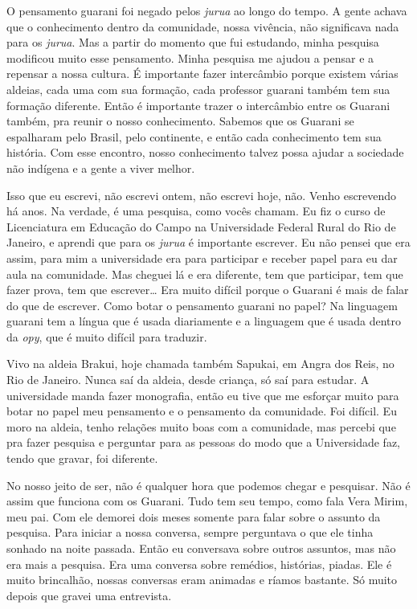 O pensamento guarani foi negado pelos \emph{jurua} ao longo do tempo. A gente
achava que o conhecimento dentro da comunidade, nossa vivência, não
significava nada para os \emph{jurua}. Mas a partir do momento que fui
estudando, minha pesquisa modificou muito esse pensamento. Minha
pesquisa me ajudou a pensar e a repensar a nossa cultura. É importante
fazer intercâmbio porque existem várias aldeias, cada uma com sua
formação, cada professor guarani também tem sua formação diferente.
Então é importante trazer o intercâmbio entre os Guarani também, pra
reunir o nosso conhecimento. Sabemos que os Guarani se espalharam pelo
Brasil, pelo continente, e então cada conhecimento tem sua história.
Com esse encontro, nosso conhecimento talvez possa ajudar a sociedade
não indígena e a gente a viver melhor.

Isso que eu escrevi, não escrevi ontem, não escrevi hoje, não. Venho
escrevendo há anos. Na verdade, é uma pesquisa, como vocês chamam. Eu
fiz o curso de Licenciatura em Educação do Campo na Universidade
Federal Rural do Rio de Janeiro, e aprendi que para os \emph{jurua} é
importante escrever. Eu não pensei que era assim, para mim a
universidade era para participar e receber papel para eu dar aula na
comunidade. Mas cheguei lá e era diferente, tem que participar, tem que
fazer prova, tem que escrever\ldots{} Era muito difícil porque o Guarani é
mais de falar do que de escrever. Como botar o pensamento guarani no
papel? Na linguagem guarani tem a língua que é usada diariamente e a
linguagem que é usada dentro da \emph{opy}, que é muito difícil para traduzir.

Vivo na aldeia Brakui, hoje chamada também Sapukai, em Angra dos Reis,
no Rio de Janeiro. Nunca saí da aldeia, desde criança, só saí para
estudar. A universidade manda fazer monografia, então eu tive que me
esforçar muito para botar no papel meu pensamento e o pensamento da
comunidade. Foi difícil. Eu moro na aldeia, tenho relações muito boas
com a comunidade, mas percebi que pra fazer pesquisa e perguntar para
as pessoas do modo que a Universidade faz, tendo que gravar, foi
diferente.

No nosso jeito de ser, não é qualquer hora que podemos chegar e
pesquisar. Não é assim que funciona com os Guarani. Tudo tem seu tempo,
como fala Vera Mirim, meu pai. Com ele demorei dois meses somente para
falar sobre o assunto da pesquisa. Para iniciar a nossa conversa,
sempre perguntava o que ele tinha sonhado na noite passada. Então eu
conversava sobre outros assuntos, mas não era mais a pesquisa. Era uma
conversa sobre remédios, histórias, piadas. Ele é muito brincalhão,
nossas conversas eram animadas e ríamos bastante. Só muito depois que
gravei uma entrevista. 

